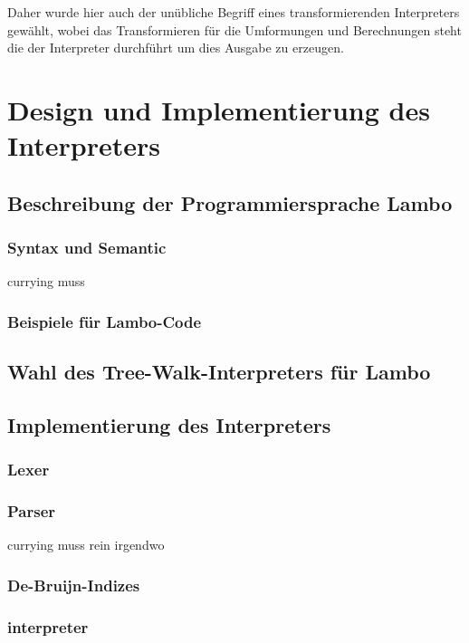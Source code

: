 \documentclass[ngerman]{article}
\begin{document}
Daher wurde hier auch der unübliche Begriff eines transformierenden Interpreters gewählt, wobei das Transformieren für die Umformungen und Berechnungen steht die der Interpreter durchführt um dies Ausgabe zu erzeugen.

\section{Design und Implementierung des Interpreters}

\subsection{Beschreibung der Programmiersprache Lambo}

\subsubsection{Syntax und Semantic}

currying muss 
\subsubsection{Beispiele für Lambo-Code}

\subsection{Wahl des Tree-Walk-Interpreters für Lambo}

\subsection{Implementierung des Interpreters}

\subsubsection{Lexer}

\subsubsection{Parser}

currying muss rein irgendwo

\subsubsection{De-Bruijn-Indizes}

\subsubsection{interpreter}
\end{document}
